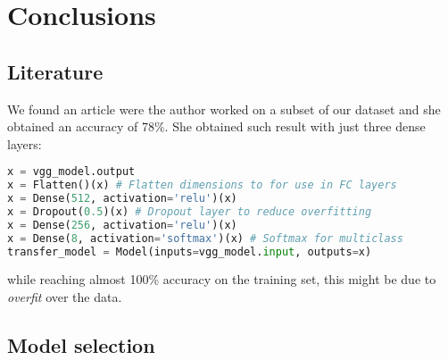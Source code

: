 \chapter{Conclusions}

\section{Literature}

We found an article \cite{womansarticle} were the author worked on a subset of our dataset and she obtained an accuracy of 78\%. She obtained such result with just three dense layers:

\begin{lstlisting}[language=Python]
x = vgg_model.output
x = Flatten()(x) # Flatten dimensions to for use in FC layers
x = Dense(512, activation='relu')(x)
x = Dropout(0.5)(x) # Dropout layer to reduce overfitting
x = Dense(256, activation='relu')(x)
x = Dense(8, activation='softmax')(x) # Softmax for multiclass
transfer_model = Model(inputs=vgg_model.input, outputs=x)	
\end{lstlisting}

while reaching almost 100\% accuracy on the training set, this might be due to \emph{overfit} over the data.

\section{Model selection}




